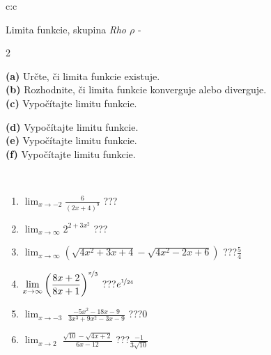 \documentclass[10pt]{report}
\begin{document}
\begin{tabular}{c:c}
\begin{minipage}[c][104.5mm][t]{0.5\linewidth}
\begin{center}
\vspace{7mm}
{\huge Limita funkcie, skupina \textit{Rho $\rho$} -}\\[5mm]
\begin{minipage}{0.95\linewidth}
\begin{center}
{\small \begin{multicols}{2} \raggedright
\textbf{(a)} Určte, či limita funkcie existuje. \\[1mm]
\textbf{(b)} Rozhodnite, či limita funkcie konverguje alebo diverguje. \\[1mm]
\textbf{(c)} Vypočítajte limitu funkcie. \par \columnbreak
\textbf{(d)} Vypočítajte limitu funkcie. \\[1mm]
\textbf{(e)} Vypočítajte limitu funkcie. \\[1mm]
\textbf{(f)} Vypočítajte limitu funkcie. \\[1mm]
\end{multicols}
}
\end{center}
\end{minipage}
\\[4mm]
\begin{minipage}{0.79\linewidth}
\begin{center}
\begin{varwidth}{\linewidth}
\begin{enumerate}
\normalsize
\item $\displaystyle\lim_{x\to-2}{\frac{6}{(2x+4)^{9}}}$\quad \dotfill\; ???\;\dotfill \quad {}
\item $\displaystyle\lim_{x\to\infty}{2^{2+3x^2}}$\quad \dotfill\; ???\;\dotfill \quad {}
\item $\displaystyle\lim_{x\to\infty}{\left(\sqrt{4x^2+3x+4} - \sqrt{4x^2-2x+6}\right)}$\quad \dotfill\; ???\;\dotfill \quad $\frac{5}{4}$
\item $\displaystyle\lim_{x\to\infty}{\left( \frac{8x+2}{8x+1} \right)^{\nicefrac{x}{3}}}$\quad \dotfill\; ???\;\dotfill \quad $e^{\nicefrac{1}{24}}$
\item $\displaystyle\lim_{x\to -3}{\;\frac{-5x^2-18x-9}{3x^3+9x^2-3x-9}}$\quad \dotfill\; ???\;\dotfill \quad $0$
\item $\displaystyle\lim_{x\to 2}{\;\frac{\sqrt{10}-\sqrt{4x+2}}{6x-12}}$\quad \dotfill\; ???\;\dotfill \quad $\frac{-1}{3\sqrt{10}}$

\end{enumerate}
\end{varwidth}
\end{center}
\end{minipage}
\end{center}
\end{minipage}
\end{tabular}
\end{document}
